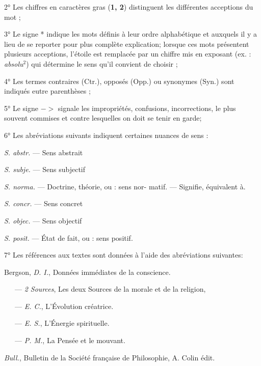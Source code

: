 \vspace{0.211cm}
2° Les chiffres en caractères gras ({\bf 1, 2}) distinguent les différentes acceptions
du mot ;

3° Le signe * indique les mots définis à leur ordre alphabétique et auxquels
il y a lieu de se reporter pour plus complète explication; lorsque ces mots présentent plusieurs acceptions, l'étoile est remplacée par un chiffre mis en exposant (ex. : {\it absolu}$^2$) qui détermine le sens qu'il convient de choisir ;

4° Les termes contraires (Ctr.), opposés (Opp.) ou synonymes (Syn.) sont
indiqués eutre parenthèses ;

5° Le signe $->$
signale les impropriétés, confusions, incorrections, le plus
souvent commises et contre lesquelles on doit se tenir en garde;

6° Les abréviations suivants indiquent certaines nuances de sens :

\hfill
\begin{minipage}[c]{.45\linewidth}
\textsf{\textit {S. abstr.}} — Sens abstrait

\textsf{\textit {S. subje.}} — Sens subjectif

\textsf{\textit {S. norma.}} — Doctrine, théorie, ou : sens nor-   
matif. — Signifie, équivalent à.
\end{minipage}
\hfill
\begin{minipage}[c]{.45\linewidth}
\textsf{\textit {S. concr.}} — Sens concret

\textsf{\textit {S. objec.}} — Sens objectif

\textsf{\textit {S. posit.}} — État de fait, ou : sens positif.
\end{minipage}

\vspace{0.211cm}

7° Les références aux textes sont données à l’aide des abréviations suivantes:

Bergson, {\it D. I.}, Données immédiates de la conscience.

\ \ \ — {\it 2 Sources}, Les deux Sources de la morale et de la religion,

\ \ \ — {\it E. C.}, L'Évolution créatrice.

\ \ \ — {\it E. S.}, L'Énergie spirituelle.

\ \ \ — {\it P. M.}, La Pensée et le mouvant.

{\it Bull.}, Bulletin de la Société française de Philosophie, A. Colin édit.

